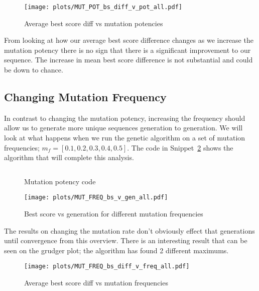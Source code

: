 \begin{figure}[h]
    \texttt{[image: plots/MUT\_POT\_bs\_diff\_v\_pot\_all.pdf]}
    \caption{Average best score diff vs mutation potencies}\label{fig:MUT-POT-bs-diff-v-pot-all}
\end{figure}

From looking at how our average best score difference changes as we increase the mutation potency there is no sign that there is a significant improvement to our sequence.
The increase in mean best score difference is not substantial and could be down to chance.

\subsection{Changing Mutation Frequency}\label{subsec:changingMutationFrequency}
In contrast to changing the mutation potency, increasing the frequency should allow us to generate more unique sequences generation to generation.
We will look at what happens when we run the genetic algorithm on a set of mutation frequencies; \(m_f = [0.1,0.2,0.3,0.4,0.5]\).
The code in Snippet~\ref{code:mutationFrequencyChecker} shows the algorithm that will complete this analysis.\\

\begin{figure}
    \inputminted{python}{code_snippets/mutationFrequencyChecker.py}
    \caption{Mutation potency code}\label{code:mutationFrequencyChecker}
\end{figure}

\begin{figure}[h]
    \texttt{[image: plots/MUT\_FREQ\_bs\_v\_gen\_all.pdf]}
    \caption{Best score vs generation for different mutation frequencies}\label{fig:MUT-FREQ-bs-v-gen-all}
\end{figure}

The results on changing the mutation rate don't obviously effect that generations until convergence from this overview.
There is an interesting result that can be seen on the grudger plot;
the algorithm has found 2 different maximums.

\begin{figure}[h]
    \texttt{[image: plots/MUT\_FREQ\_bs\_diff\_v\_freq\_all.pdf]}
    \caption{Average best score diff vs mutation frequencies}\label{fig:MUT-FREQ-bs-diff-v-freq-all}
\end{figure}

